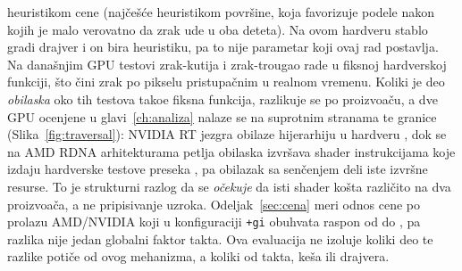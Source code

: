 heuristikom cene (naj\v{c}e\v{s}\'ce heuristikom povr\v{s}ine, koja favorizuje podele nakon kojih je malo verovatno da zrak
ude u oba deteta). Na ovom hardveru stablo gradi drajver i on bira heuristiku, pa to nije parametar koji ovaj rad
postavlja. Na dana\v{s}njim GPU testovi zrak-kutija i zrak-trougao rade u fiksnoj hardverskoj funkciji, \v{s}to
\v{c}ini zrak po pikselu pristupa\v{c}nim u realnom vremenu. Koliki je deo \emph{obilaska} oko tih testova tako\dj e
fiksna funkcija, razlikuje se po proizvo\dj a\v{c}u, a dve GPU ocenjene u glavi~\ref{ch:analiza} nalaze se na
suprotnim stranama te granice (Slika~\ref{fig:traversal}): NVIDIA RT jezgra obilaze hijerarhiju u hardveru
\cite{nvidia_turing}, dok se na AMD RDNA arhitekturama petlja obilaska izvr\v{s}ava shader instrukcijama koje
izdaju hardverske testove preseka \cite{amd_rdna_isa}, pa obilazak sa sen\v{c}enjem deli iste izvr\v{s}ne resurse.
To je strukturni razlog da se \emph{o\v{c}ekuje} da isti shader ko\v{s}ta razli\v{c}ito na dva proizvo\dj a\v{c}a, a ne
pripisivanje uzroka. Odeljak~\ref{sec:cena} meri odnos cene po prolazu AMD/NVIDIA koji u konfiguraciji
\texttt{+gi} obuhvata raspon od \perfRatioMin{} do \perfRatioMax{}, pa razlika nije jedan globalni faktor
takta. Ova evaluacija ne izoluje koliki deo te razlike poti\v{c}e od ovog mehanizma, a koliki od takta,
ke\v{s}a ili drajvera.

